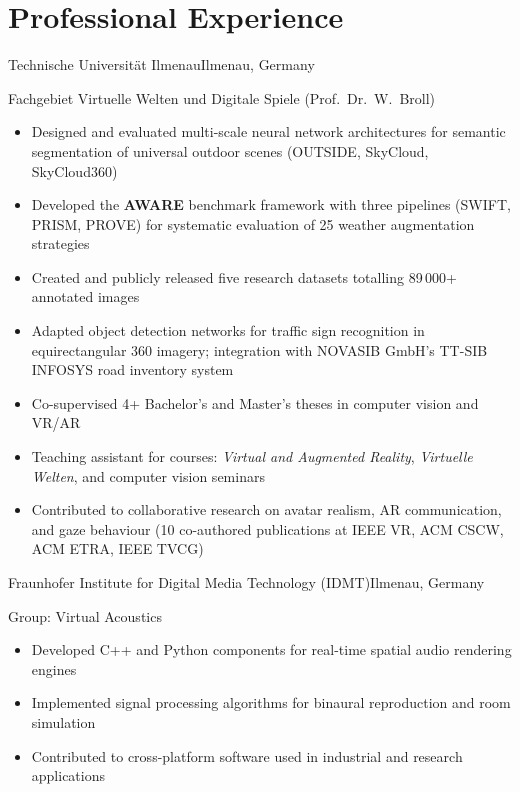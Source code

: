 \documentclass[11pt,a4paper,sans]{moderncv}
\begin{document}
\section{Professional Experience}
%
  {Technische Universit\"at Ilmenau}{Ilmenau, Germany}{}%
  {Fachgebiet Virtuelle Welten und Digitale Spiele (Prof.\ Dr.\ W.\ Broll)%
   \begin{itemize}[nosep, leftmargin=1.2em, topsep=2pt]
     \item[\textendash] Designed and evaluated multi-scale neural network architectures for semantic segmentation of universal outdoor scenes (OUTSIDE, SkyCloud, SkyCloud360)
     \item[\textendash] Developed the \textbf{AWARE} benchmark framework with three pipelines (SWIFT, PRISM, PROVE) for systematic evaluation of 25 weather augmentation strategies
     \item[\textendash] Created and publicly released five research datasets totalling 89\,000+ annotated images
     \item[\textendash] Adapted object detection networks for traffic sign recognition in equirectangular 360\textdegree{} imagery; integration with NOVASIB GmbH's TT-SIB INFOSYS\textregistered{} road inventory system
     \item[\textendash] Co-supervised 4+ Bachelor's and Master's theses in computer vision and VR/AR
     \item[\textendash] Teaching assistant for courses: \textit{Virtual and Augmented Reality}, \textit{Virtuelle Welten}, and computer vision seminars
     \item[\textendash] Contributed to collaborative research on avatar realism, AR communication, and gaze behaviour (10 co-authored publications at IEEE VR, ACM CSCW, ACM ETRA, IEEE TVCG)
   \end{itemize}}

%
  {Fraunhofer Institute for Digital Media Technology (IDMT)}{Ilmenau, Germany}{}%
  {Group: Virtual Acoustics%
   \begin{itemize}[nosep, leftmargin=1.2em, topsep=2pt]
     \item[\textendash] Developed C++ and Python components for real-time spatial audio rendering engines
     \item[\textendash] Implemented signal processing algorithms for binaural reproduction and room simulation
     \item[\textendash] Contributed to cross-platform software used in industrial and research applications
   \end{itemize}}
\end{document}

